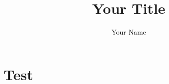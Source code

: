 \documentclass[isdraft]{kclthesis}
\title{Your Title}
\author{Your Name}
\begin{document}
\maketitle


\section{Test}
\end{document}
